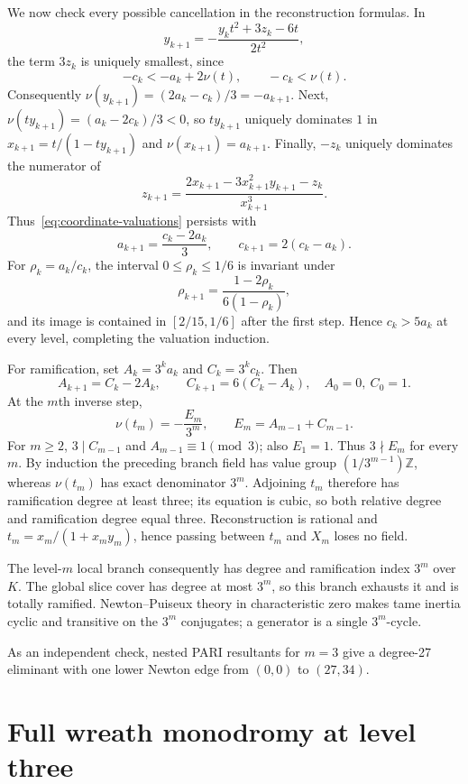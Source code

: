 \documentclass[11pt]{article}
\begin{document}
We now check every possible cancellation in the reconstruction formulas.  In
\[
y_{k+1}=-\frac{y_kt^2+3z_k-6t}{2t^2},
\]
the term $3z_k$ is uniquely smallest, since
\[
-c_k<-a_k+2\nu(t),\qquad -c_k<\nu(t).
\]
Consequently $\nu(y_{k+1})=(2a_k-c_k)/3=-a_{k+1}$.  Next,
$\nu(ty_{k+1})=(a_k-2c_k)/3<0$, so $ty_{k+1}$ uniquely dominates $1$ in
$x_{k+1}=t/(1-ty_{k+1})$ and $\nu(x_{k+1})=a_{k+1}$.  Finally, $-z_k$
uniquely dominates the numerator of
\[
z_{k+1}=\frac{2x_{k+1}-3x_{k+1}^2y_{k+1}-z_k}{x_{k+1}^3}.
\]
Thus~\eqref{eq:coordinate-valuations} persists with
\begin{equation}
a_{k+1}=\frac{c_k-2a_k}{3},\qquad
c_{k+1}=2(c_k-a_k).
\label{eq:recurrence}
\end{equation}
For $\rho_k=a_k/c_k$, the interval $0\leq\rho_k\leq1/6$ is invariant under
\[
\rho_{k+1}=\frac{1-2\rho_k}{6(1-\rho_k)},
\]
and its image is contained in $[2/15,1/6]$ after the first step.  Hence
$c_k>5a_k$ at every level, completing the valuation induction.

For ramification, set $A_k=3^ka_k$ and $C_k=3^kc_k$.  Then
\[
A_{k+1}=C_k-2A_k,\qquad C_{k+1}=6(C_k-A_k),
\quad A_0=0,\ C_0=1.
\]
At the $m$th inverse step,
\[
\nu(t_m)=-\frac{E_m}{3^m},\qquad E_m=A_{m-1}+C_{m-1}.
\]
For $m\geq2$, $3\mid C_{m-1}$ and $A_{m-1}\equiv1\pmod3$; also $E_1=1$.
Thus $3\nmid E_m$ for every $m$.  By induction the preceding branch field has
value group $(1/3^{m-1})\mathbb Z$, whereas $\nu(t_m)$ has exact denominator
$3^m$.  Adjoining $t_m$ therefore has ramification degree at least three; its
equation is cubic, so both relative degree and ramification degree equal
three.  Reconstruction is rational and $t_m=x_m/(1+x_my_m)$, hence passing
between $t_m$ and $X_m$ loses no field.

The level-$m$ local branch consequently has degree and ramification index
$3^m$ over $K$.  The global slice cover has degree at most $3^m$, so this
branch exhausts it and is totally ramified.  Newton--Puiseux theory in
characteristic zero makes tame inertia cyclic and transitive on the $3^m$
conjugates; a generator is a single $3^m$-cycle.

As an independent check, nested PARI resultants for $m=3$ give a degree-27
eliminant with one lower Newton edge from $(0,0)$ to $(27,34)$.

\section{Full wreath monodromy at level three}
\end{document}
